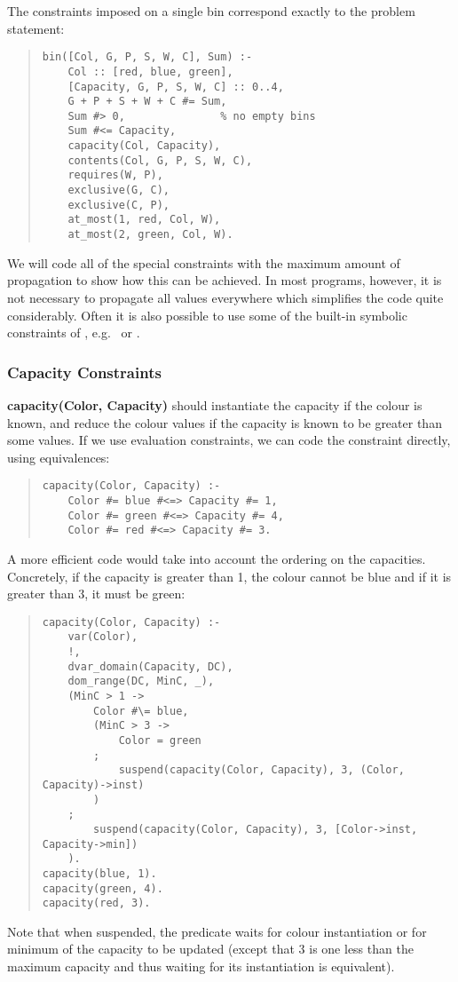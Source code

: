 The constraints imposed on a single bin correspond exactly to the
problem statement:
\begin{quote}
\begin{verbatim}
bin([Col, G, P, S, W, C], Sum) :-
    Col :: [red, blue, green],
    [Capacity, G, P, S, W, C] :: 0..4,
    G + P + S + W + C #= Sum,
    Sum #> 0,               % no empty bins
    Sum #<= Capacity,
    capacity(Col, Capacity),
    contents(Col, G, P, S, W, C),
    requires(W, P),
    exclusive(G, C),
    exclusive(C, P),
    at_most(1, red, Col, W),
    at_most(2, green, Col, W).
\end{verbatim}
\end{quote}

We will code all of the special constraints with the
maximum amount of propagation to show how this can be
achieved.
In most programs, however, it is not necessary to
propagate all values everywhere which simplifies the
code quite considerably.
Often it is also possible to use some of the built-in symbolic
constraints of \eclipse, e.g.\  or .

\subsubsection{Capacity Constraints}
{\bf capacity(Color, Capacity)} should instantiate the capacity
if the colour is known, and reduce the colour values
if the capacity is known to be greater than
some values.
If we use evaluation constraints, we can code the constraint directly,
using equivalences:
\begin{quote}
\begin{verbatim}
capacity(Color, Capacity) :-
    Color #= blue #<=> Capacity #= 1,
    Color #= green #<=> Capacity #= 4,
    Color #= red #<=> Capacity #= 3.
\end{verbatim}
\end{quote}

A more efficient code would take into account the ordering on the
capacities.
Concretely, if the capacity is greater than 1, the colour cannot
be blue and if it is greater than 3, it must be green:

\begin{quote}
\begin{verbatim}
capacity(Color, Capacity) :-
    var(Color),
    !,
    dvar_domain(Capacity, DC),
    dom_range(DC, MinC, _),
    (MinC > 1 ->
        Color #\= blue,
        (MinC > 3 ->
            Color = green
        ;
            suspend(capacity(Color, Capacity), 3, (Color, Capacity)->inst)
        )
    ;
        suspend(capacity(Color, Capacity), 3, [Color->inst, Capacity->min])
    ).
capacity(blue, 1).
capacity(green, 4).
capacity(red, 3).
\end{verbatim}
\end{quote}
Note that when suspended, the predicate waits for colour instantiation
or for minimum of the capacity to be updated (except that 3 is one less
than the maximum capacity and thus waiting for its instantiation
is equivalent).

